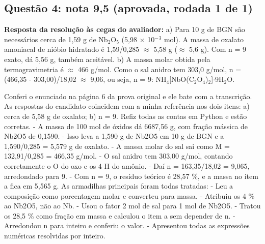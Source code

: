 \documentclass{article}%
\begin{document}
\subsection*{Questão 4: nota 9,5 (aprovada, rodada 1 de 1)}%
\textbf{Resposta da resolução às cegas do avaliador:} a) Para 10 g de BGN são necessários cerca de 1,59 g de Nb$_{2}$O$_{5}$ (5,98 $\times$ 10$^{-}$$^3$ mol). A massa de oxalato amoniacal de nióbio hidratado é 1,59/0,285 $\approx$ 5,58 g ($\approx$ 5,6 g). Com n = 9 exato, dá 5,56 g, também aceitável.\newline%
b) A massa molar obtida pela termogravimetria é $\approx$ 466 g/mol. Como o sal anidro tem 303,0 g/mol, n = (466,35 - 303,00)/18,02 $\approx$ 9,06, ou seja, n = 9: NH$_{4}${[}NbO(C$_{2}$O$_{4}$)$_{2}${]}$\cdot$9H$_{2}$O.\par %
Conferi o enunciado na página 6 da prova original e ele bate com a transcrição. As respostas do candidato coincidem com a minha referência nos dois itens: a) cerca de 5,58 g de oxalato; b) n = 9. Refiz todas as contas em Python e estão corretas.\newline%
{-} A massa de 100 mol de óxidos dá 6687,56 g, com fração mássica de Nb2O5 de 0,1590.\newline%
{-} Isso leva a 1,590 g de Nb2O5 em 10 g de BGN e a 1,590/0,285 = 5,579 g de oxalato.\newline%
{-} A massa molar do sal sai como M = 132,91/0,285 = 466,35 g/mol.\newline%
{-} O sal anidro tem 303,00 g/mol, contando corretamente o O do oxo e os 4 H do amônio.\newline%
{-} Daí n = 163,35/18,02 = 9,065, arredondado para 9.\newline%
{-} Com n = 9, o resíduo teórico é 28,57 \%, e a massa no item a fica em 5,565 g.\newline%
\newline%
As armadilhas principais foram todas tratadas:\newline%
{-} Leu a composição como porcentagem molar e converteu para massa.\newline%
{-} Atribuiu os 4 \% ao Nb2O5, não ao Nb.\newline%
{-} Usou o fator 2 mol de sal para 1 mol de Nb2O5.\newline%
{-} Tratou os 28,5 \% como fração em massa e calculou o item a sem depender de n.\newline%
{-} Arredondou n para inteiro e conferiu o valor.\newline%
{-} Apresentou todas as expressões numéricas resolvidas por inteiro.\newline%
$$
\end{document}
